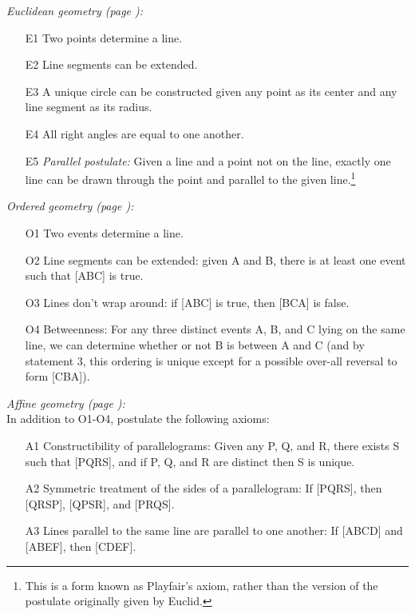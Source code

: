 \documentclass{genrel}
\begin{document}
\emph{Euclidean geometry (page \pageref{euclidean-axioms}):}\\\label{euclidean-summary}
\begin{itemize}
\item[E1] Two points determine a line.
\item[E2] Line segments can be extended.
\item[E3] A unique circle can be constructed given any point as its center and any line segment as its radius.
\item[E4] All right angles are equal to one another.
\item[E5] \emph{Parallel postulate:} Given a line and a point not on the line, exactly one line
          can be drawn through the point and parallel to the given line.\footnote{This is a form known as Playfair's axiom, rather than the version of the
                   postulate originally given by Euclid.}
\end{itemize}

\emph{Ordered geometry (page \pageref{ordered-geometry-axioms}):}\\\label{ordered-summary}
\begin{itemize}
\item[O1] Two events determine a line.
\item[O2] Line segments can be extended: given A and B, there is at least one event such that [ABC] is true.
\item[O3] Lines don't wrap around: if [ABC] is true, then [BCA] is false.
\item[O4] Betweenness: For any three distinct events A, B, and C lying on the same line, we can determine whether or not B is between A and C (and by statement 3, this ordering is unique except for a possible over-all reversal to form [CBA]).
\end{itemize}

\emph{Affine geometry (page \pageref{affine-axioms}):}\\\label{affine-summary}
In addition to O1-O4, postulate the following axioms:
\begin{itemize}
\item[A1] Constructibility of parallelograms: Given any P, Q, and R, there exists S such that [PQRS], and if P, Q, and R are distinct then S is unique.
\item[A2] Symmetric treatment of the sides of a parallelogram: If [PQRS], then [QRSP], [QPSR], and [PRQS].
\item[A3] Lines parallel to the same line are parallel to one another: If [ABCD] and [ABEF], then [CDEF].
\end{itemize}
\end{document}
